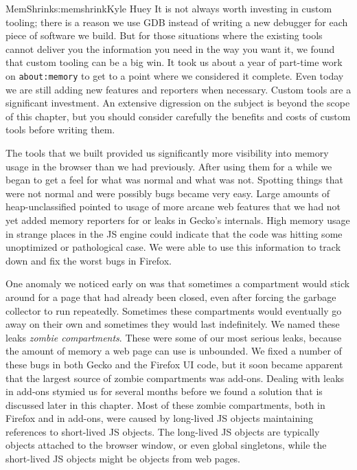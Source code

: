 \begin{aosachapter}{MemShrink}{s:memshrink}{Kyle Huey}
It is not always worth investing in custom tooling; there is a reason we
use GDB instead of writing a new debugger for each piece of software we
build. But for those situations where the existing tools cannot deliver
you the information you need in the way you want it, we found that
custom tooling can be a big win. It took us about a year of part-time
work on \texttt{about:memory} to get to a point where we considered it
complete. Even today we are still adding new features and reporters when
necessary. Custom tools are a significant investment. An extensive
digression on the subject is beyond the scope of this chapter, but you
should consider carefully the benefits and costs of custom tools before
writing them.


The tools that we built provided us significantly more visibility into
memory usage in the browser than we had previously. After using them for
a while we began to get a feel for what was normal and what was not.
Spotting things that were not normal and were possibly bugs became very
easy. Large amounts of heap-unclassified pointed to usage of more arcane
web features that we had not yet added memory reporters for or leaks in
Gecko's internals. High memory usage in strange places in the JS engine
could indicate that the code was hitting some unoptimized or
pathological case. We were able to use this information to track down
and fix the worst bugs in Firefox.

One anomaly we noticed early on was that sometimes a compartment would
stick around for a page that had already been closed, even after forcing
the garbage collector to run repeatedly. Sometimes these compartments
would eventually go away on their own and sometimes they would last
indefinitely. We named these leaks \emph{zombie compartments}. These
were some of our most serious leaks, because the amount of memory a web
page can use is unbounded. We fixed a number of these bugs in both Gecko
and the Firefox UI code, but it soon became apparent that the largest
source of zombie compartments was add-ons. Dealing with leaks in add-ons
stymied us for several months before we found a solution that is
discussed later in this chapter. Most of these zombie compartments, both
in Firefox and in add-ons, were caused by long-lived JS objects
maintaining references to short-lived JS objects. The long-lived JS
objects are typically objects attached to the browser window, or even
global singletons, while the short-lived JS objects might be objects
from web pages.


\end{aosachapter}
